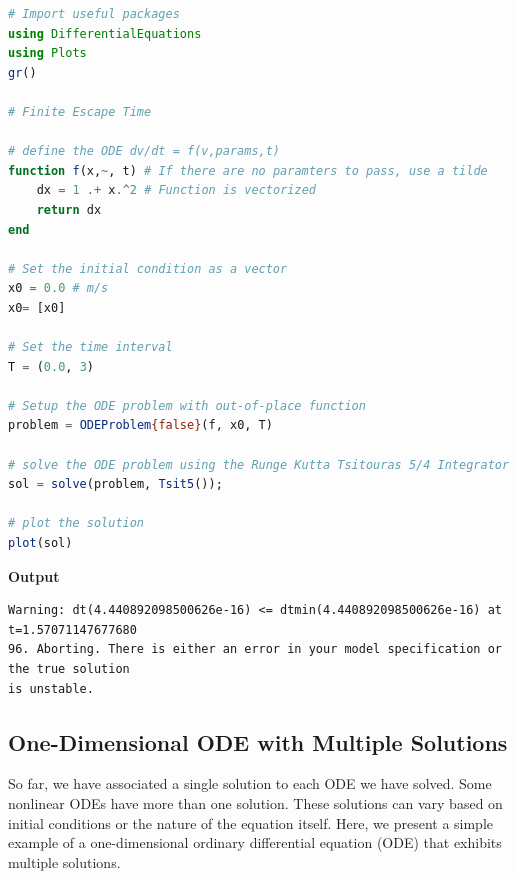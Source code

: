 \begin{lstlisting}[language=Julia,style=mystyle]
# Import useful packages
using DifferentialEquations
using Plots 
gr()

# Finite Escape Time

# define the ODE dv/dt = f(v,params,t)
function f(x,~, t) # If there are no paramters to pass, use a tilde
    dx = 1 .+ x.^2 # Function is vectorized
    return dx
end

# Set the initial condition as a vector
x0 = 0.0 # m/s
x0= [x0]

# Set the time interval
T = (0.0, 3) 

# Setup the ODE problem with out-of-place function
problem = ODEProblem{false}(f, x0, T)

# solve the ODE problem using the Runge Kutta Tsitouras 5/4 Integrator
sol = solve(problem, Tsit5());

# plot the solution
plot(sol)
\end{lstlisting}
\textbf{Output} 
\begin{verbatim}
Warning: dt(4.440892098500626e-16) <= dtmin(4.440892098500626e-16) at t=1.57071147677680
96. Aborting. There is either an error in your model specification or the true solution 
is unstable.
\end{verbatim}

\subsection{One-Dimensional ODE with Multiple Solutions}
\label{sec:ODEwithInfiniteSolutions}

So far, we have associated a single solution to each ODE we have solved. Some nonlinear ODEs have more than one solution. These solutions can vary based on initial conditions or the nature of the equation itself. Here, we present a simple example of a one-dimensional ordinary differential equation (ODE) that exhibits multiple solutions.

